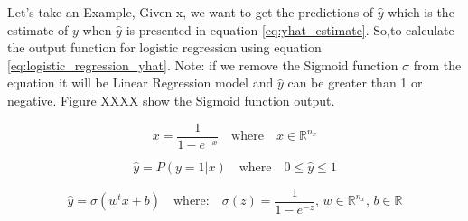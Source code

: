 Let's take an Example, Given x, we want to get the predictions of $\widehat{y}$ which is the estimate of $y$  when $\widehat{y}$  is presented in equation \eqref{eq:yhat_estimate}. So,to calculate the output function for logistic regression using equation \eqref{eq:logistic_regression_yhat}. Note: if we remove the Sigmoid function $\sigma$ from the equation it will be Linear Regression model and $\widehat{y}$ can be greater than 1 or negative. Figure XXXX show the Sigmoid function output. %

\begin{equation}\label{eq:logistic_function}
  x = \frac{1}{1-e^{-x}} \quad \text{where} \quad x \in \mathbb{R}^{n_x} 
\end{equation}

\begin{equation}
  \label{eq:yhat_estimate}
    \widehat{y} = P(y=1 | x) \quad \text{where}  \quad 0 \le \widehat{y}  \le 1
  \end{equation}

\begin{equation}
  \label{eq:logistic_regression_yhat}
  \widehat{y} = \sigma(w^t x + b) \quad \text{where:} \quad  \sigma(z) = \frac{1}{1-e^{-z}} \text{, }  w \in  \mathbb{R}^{n_x} \text{, }  b \in  \mathbb{R}  
  \end{equation}

